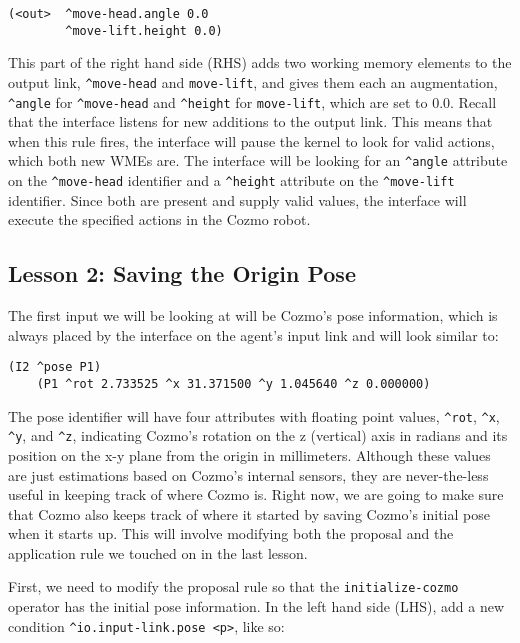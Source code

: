 \begin{verbatim}
(<out>  ^move-head.angle 0.0
        ^move-lift.height 0.0)
\end{verbatim}

This part of the right hand side (RHS) adds two working memory elements
to the output link, \texttt{\^{}move-head} and \texttt{move-lift}, and
gives them each an augmentation, \texttt{\^{}angle} for
\texttt{\^{}move-head} and \texttt{\^{}height} for \texttt{move-lift},
which are set to 0.0. Recall that the interface listens for new
additions to the output link. This means that when this rule fires, the
interface will pause the kernel to look for valid actions, which both
new WMEs are. The interface will be looking for an \texttt{\^{}angle}
attribute on the \texttt{\^{}move-head} identifier and a
\texttt{\^{}height} attribute on the \texttt{\^{}move-lift} identifier.
Since both are present and supply valid values, the interface will
execute the specified actions in the Cozmo robot.

\hypertarget{lesson-2-saving-the-origin-pose}{%
\subsection{Lesson 2: Saving the Origin
Pose}\label{lesson-2-saving-the-origin-pose}}

The first input we will be looking at will be Cozmo's pose information,
which is always placed by the interface on the agent's input link and
will look similar to:

\begin{verbatim}
(I2 ^pose P1)
    (P1 ^rot 2.733525 ^x 31.371500 ^y 1.045640 ^z 0.000000)
\end{verbatim}

The pose identifier will have four attributes with floating point
values, \texttt{\^{}rot}, \texttt{\^{}x}, \texttt{\^{}y}, and
\texttt{\^{}z}, indicating Cozmo's rotation on the z (vertical) axis in
radians and its position on the x-y plane from the origin in
millimeters. Although these values are just estimations based on Cozmo's
internal sensors, they are never-the-less useful in keeping track of
where Cozmo is. Right now, we are going to make sure that Cozmo also
keeps track of where it started by saving Cozmo's initial pose when it
starts up. This will involve modifying both the proposal and the
application rule we touched on in the last lesson.

First, we need to modify the proposal rule so that the
\texttt{initialize-cozmo} operator has the initial pose information. In
the left hand side (LHS), add a new condition
\texttt{\^{}io.input-link.pose\ \textless{}p\textgreater{}}, like so:


